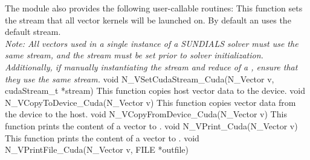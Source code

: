 The module {\nveccuda} also provides the following user-callable routines:
{
  This function sets the {\cuda} stream that all vector kernels will be launched on.
  By default an {\nveccuda} uses the default {\cuda} stream.\\

  \textit{Note: All vectors used in a single instance of a SUNDIALS solver must
  use the same {\cuda} stream, and the {\cuda} stream must be set prior to
  solver initialization. Additionally, if manually instantiating the stream and
  reduce  of a , ensure that they
  use the same {\cuda} stream.}
}
{
  void N\_VSetCudaStream\_Cuda(N\_Vector v, cudaStream\_t *stream)
}
{
 This function copies host vector data to the device.
}
{
 void N\_VCopyToDevice\_Cuda(N\_Vector v)
}
{
 This function copies vector data from the device to the host.
}
{
 void N\_VCopyFromDevice\_Cuda(N\_Vector v)
}
{
  This function prints the content of a {\cuda} vector to .
}
{
  void N\_VPrint\_Cuda(N\_Vector v)
}
{
  This function prints the content of a {\cuda} vector to .
}
{
  void N\_VPrintFile\_Cuda(N\_Vector v, FILE *outfile)
}

